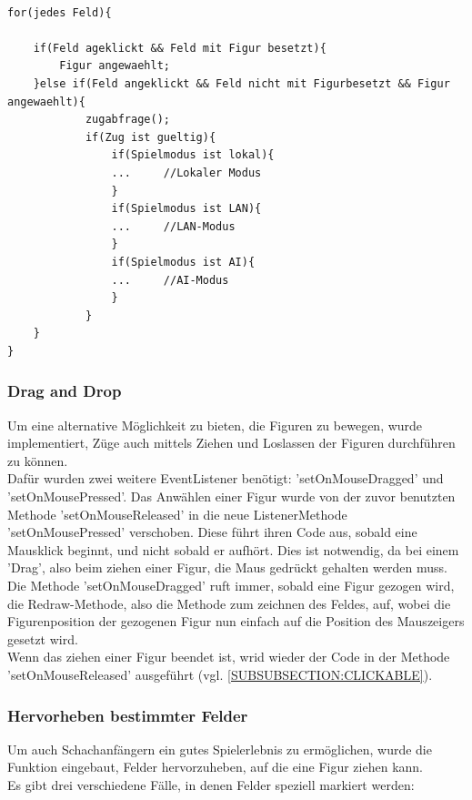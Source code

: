 \documentclass[12pt,a4paper]{article}
\begin{document}
{\lstset{language=java}
\begin{lstlisting}

for(jedes Feld){

	if(Feld ageklickt && Feld mit Figur besetzt){
		Figur angewaehlt;
	}else if(Feld angeklickt && Feld nicht mit Figurbesetzt && Figur angewaehlt){
			zugabfrage();
			if(Zug ist gueltig){
				if(Spielmodus ist lokal){
				... 	//Lokaler Modus
				}
				if(Spielmodus ist LAN){
				...		//LAN-Modus
				}
				if(Spielmodus ist AI){
				...		//AI-Modus
				}
			}	
	}
}

\end{lstlisting}
\subsubsection{Drag and Drop}
\label{SUBSUBSECTION:DRAGANDDROP}
Um eine alternative Möglichkeit zu bieten, die Figuren zu bewegen, wurde implementiert, Züge auch mittels Ziehen und Loslassen der Figuren durchführen zu können.\\
Dafür wurden zwei weitere EventListener benötigt: 'setOnMouseDragged' und 'setOnMousePressed'. Das Anwählen einer Figur wurde von der zuvor benutzten Methode 'setOnMouseReleased' in die neue ListenerMethode 'setOnMousePressed' verschoben. Diese führt ihren Code aus, sobald eine Mausklick beginnt, und nicht sobald er aufhört. Dies ist notwendig, da bei einem 'Drag', also beim ziehen einer Figur, die Maus gedrückt gehalten werden muss.\\
Die Methode 'setOnMouseDragged' ruft immer, sobald eine Figur gezogen wird, die Redraw-Methode, also die Methode zum zeichnen des Feldes, auf, wobei die Figurenposition der gezogenen Figur nun einfach auf die Position des Mauszeigers gesetzt wird.\\
Wenn das ziehen einer Figur beendet ist, wrid wieder der Code in der Methode 'setOnMouseReleased' ausgeführt (vgl. \ref{SUBSUBSECTION:CLICKABLE}).


\subsubsection{Hervorheben bestimmter Felder}
\label{SUBSUBSECTION:TILEHIGHLIGHT}
Um auch Schachanfängern ein gutes Spielerlebnis zu ermöglichen, wurde die Funktion eingebaut, Felder hervorzuheben, auf die eine Figur ziehen kann.\\
Es gibt drei verschiedene Fälle, in denen Felder speziell markiert werden: 
\begin{itemize}


\end{itemize}}
\end{document}

